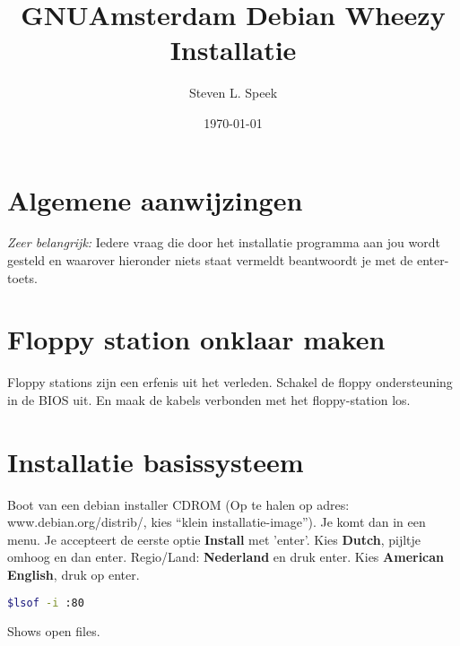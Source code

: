 \documentclass[12pt,a4paper]{article}
\begin{document}
\graphicspath{ {./images/} }
\lstset{language=bash}      
\author{Steven L. Speek}
\title{GNUAmsterdam Debian Wheezy Installatie}
\date{\today}
\maketitle
{}
\section{Algemene aanwijzingen}
\emph{Zeer belangrijk:} Iedere vraag die door het installatie programma aan jou wordt gesteld en waarover hieronder niets staat vermeldt beantwoordt je met de enter-toets.
\section{Floppy station onklaar maken}
Floppy stations zijn een erfenis uit het verleden. Schakel de floppy ondersteuning in de BIOS uit. En maak de kabels verbonden met het floppy-station los.
\section{Installatie basissysteem}
Boot van een debian installer CDROM (Op te halen op adres: www.debian.org/distrib/, kies “klein installatie-image”).
Je komt dan in een menu. 
Je accepteert de eerste optie {\bf Install } met 'enter'. Kies {\bf Dutch}, pijltje omhoog en dan enter. Regio/Land: {\bf Nederland} en druk enter. Kies {\bf American English}, druk op enter.
\begin{lstlisting}[language=bash]
$lsof -i :80
\end{lstlisting}
Shows open files.
\end{document}
